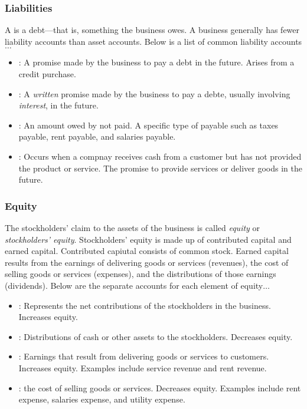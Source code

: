 \documentclass{article}
\begin{document}
\subsubsection{Liabilities}

A  is a debt---that is, something the business owes. A business generally has fewer liability accounts than asset accounts. Below is a list of common liability accounts$\dots$
\begin{itemize}
  \item {}: A promise made by the business to pay a debt in the future. Arises from a credit purchase. 
  \item {}: A \emph{written} promise made by the business to pay a debte, usually involving \emph{interest}, in the future. 
  \item {}: An amount owed by not paid. A specific type of payable such as taxes payable, rent payable, and salaries payable. 
  \item {}: Occurs when a compnay receives cash from a customer but has not provided the product or service. The promise to provide services or deliver goods in the future. 
\end{itemize}

\subsubsection{Equity}

The stockholders' claim to the assets of the business is called \emph{equity} or \emph{stockholders' equity}. Stockholders' equity is made up of contributed capital and earned capital. Contributed capiutal consists of common stock. Earned capital results from the earnings of delivering goods or services (revenues), the cost of selling goods or services (expenses), and the distributions of those earnings (dividends). Below are the separate accounts for each element of equity$\dots$ 
\begin{itemize}
  \item {}: Represents the net contributions of the stockholders in the business. Increases equity. 
  \item {}: Distributions of cash or other assets to the stockholders. Decreases equity. 
  \item {}: Earnings that result from delivering goods or services to customers. Increases equity. Examples include service revenue and rent revenue. 
  \item {}: the cost of selling goods or services. Decreases equity. Examples include rent expense, salaries expense, and utility expense.
\end{itemize}
\end{document}
